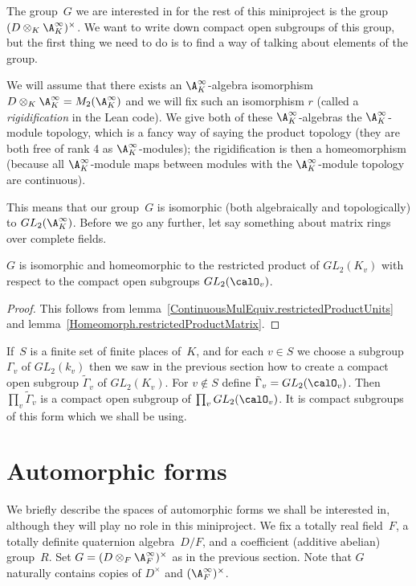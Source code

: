 The group~$G$ we are interested in for the rest of this miniproject is the group
$(D\otimes_K\A_K^\infty)^\times$. We want to write down compact open subgroups of this group,
but the first thing we need to do is to find a way of talking about elements of the group.

We will assume that there exists an $\A_K^\infty$-algebra isomorphism
$D\otimes_K\A_K^\infty=M_2(\A_K^\infty)$ and we will fix such an isomorphism $r$
(called a \emph{rigidification} in the Lean code). We give both of these $\A_K^\infty$-algebras
the $\A_K^\infty$-module topology, which is a fancy way of saying the product topology
(they are both free of rank 4 as $\A_K^\infty$-modules); the rigidification is then
a homeomorphism (because all $\A_K^\infty$-module maps between modules with the $\A_K^\infty$-module
topology are continuous).

This means that our group~$G$ is isomorphic (both algebraically and topologically)
to $GL_2(\A_K^\infty)$. Before we go any further,
let say something about matrix rings over complete fields.

\begin{theorem}
  \label{nolean-GL2-finite-adeles}
  $G$ is isomorphic and homeomorphic
  to the restricted product of $GL_2(K_v)$ with respect
  to the compact open subgroups $GL_2(\calO_v)$.
\end{theorem}
\begin{proof}
  This follows from lemma~\ref{ContinuousMulEquiv.restrictedProductUnits}
  and lemma~\ref{Homeomorph.restrictedProductMatrix}.
\end{proof}

If~$S$ is a finite set of finite places of~$K$, and for each $v\in S$ we choose
a subgroup $\Gamma_v$ of $GL_2(k_v)$ then we saw in the previous section how to
create a compact open subgroup $\tilde{\Gamma}_v$ of $GL_2(K_v)$. For $v\notin S$
define $\tilde{\Gamma}_v=GL_2(\calO_v)$. Then $\prod_v\tilde{\Gamma}_v$ is a compact
open subgroup of $\prod_vGL_2(\calO_v)$. It is compact subgroups of this form
which we shall be using.

\section{Automorphic forms}

We briefly describe the spaces of automorphic forms we shall be interested in, although
they will play no role in this miniproject. We fix a totally real field~$F$, a
totally definite quaternion algebra~$D/F$, and a coefficient (additive abelian) group~$R$.
Set $G=(D\otimes_F\A_F^\infty)^\times$ as in the previous section. Note that $G$
naturally contains copies of $D^\times$ and $(\A_F^\infty)^\times$.

